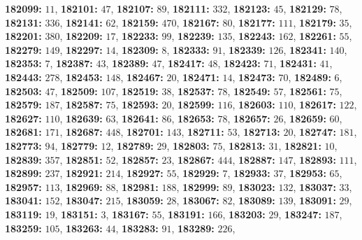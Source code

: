 \textsf{\bfseries 182099:} $11$, \textsf{\bfseries 182101:} $47$, \textsf{\bfseries 182107:} $89$, \textsf{\bfseries 182111:} $332$, \textsf{\bfseries 182123:} $45$, \textsf{\bfseries 182129:} $78$, \textsf{\bfseries 182131:} $336$, \textsf{\bfseries 182141:} $62$, \textsf{\bfseries 182159:} $470$, \textsf{\bfseries 182167:} $80$, \textsf{\bfseries 182177:} $111$, \textsf{\bfseries 182179:} $35$, \textsf{\bfseries 182201:} $380$, \textsf{\bfseries 182209:} $17$, \textsf{\bfseries 182233:} $99$, \textsf{\bfseries 182239:} $135$, \textsf{\bfseries 182243:} $162$, \textsf{\bfseries 182261:} $55$, \textsf{\bfseries 182279:} $149$, \textsf{\bfseries 182297:} $14$, \textsf{\bfseries 182309:} $8$, \textsf{\bfseries 182333:} $91$, \textsf{\bfseries 182339:} $126$, \textsf{\bfseries 182341:} $140$, \textsf{\bfseries 182353:} $7$, \textsf{\bfseries 182387:} $43$, \textsf{\bfseries 182389:} $47$, \textsf{\bfseries 182417:} $48$, \textsf{\bfseries 182423:} $71$, \textsf{\bfseries 182431:} $41$, \textsf{\bfseries 182443:} $278$, \textsf{\bfseries 182453:} $148$, \textsf{\bfseries 182467:} $20$, \textsf{\bfseries 182471:} $14$, \textsf{\bfseries 182473:} $70$, \textsf{\bfseries 182489:} $6$, \textsf{\bfseries 182503:} $47$, \textsf{\bfseries 182509:} $107$, \textsf{\bfseries 182519:} $38$, \textsf{\bfseries 182537:} $78$, \textsf{\bfseries 182549:} $57$, \textsf{\bfseries 182561:} $75$, \textsf{\bfseries 182579:} $187$, \textsf{\bfseries 182587:} $75$, \textsf{\bfseries 182593:} $20$, \textsf{\bfseries 182599:} $116$, \textsf{\bfseries 182603:} $110$, \textsf{\bfseries 182617:} $122$, \textsf{\bfseries 182627:} $110$, \textsf{\bfseries 182639:} $63$, \textsf{\bfseries 182641:} $86$, \textsf{\bfseries 182653:} $78$, \textsf{\bfseries 182657:} $26$, \textsf{\bfseries 182659:} $60$, \textsf{\bfseries 182681:} $171$, \textsf{\bfseries 182687:} $448$, \textsf{\bfseries 182701:} $143$, \textsf{\bfseries 182711:} $53$, \textsf{\bfseries 182713:} $20$, \textsf{\bfseries 182747:} $181$, \textsf{\bfseries 182773:} $94$, \textsf{\bfseries 182779:} $12$, \textsf{\bfseries 182789:} $29$, \textsf{\bfseries 182803:} $75$, \textsf{\bfseries 182813:} $31$, \textsf{\bfseries 182821:} $10$, \textsf{\bfseries 182839:} $357$, \textsf{\bfseries 182851:} $52$, \textsf{\bfseries 182857:} $23$, \textsf{\bfseries 182867:} $444$, \textsf{\bfseries 182887:} $147$, \textsf{\bfseries 182893:} $111$, \textsf{\bfseries 182899:} $237$, \textsf{\bfseries 182921:} $214$, \textsf{\bfseries 182927:} $55$, \textsf{\bfseries 182929:} $7$, \textsf{\bfseries 182933:} $37$, \textsf{\bfseries 182953:} $65$, \textsf{\bfseries 182957:} $113$, \textsf{\bfseries 182969:} $88$, \textsf{\bfseries 182981:} $188$, \textsf{\bfseries 182999:} $89$, \textsf{\bfseries 183023:} $132$, \textsf{\bfseries 183037:} $33$, \textsf{\bfseries 183041:} $152$, \textsf{\bfseries 183047:} $215$, \textsf{\bfseries 183059:} $28$, \textsf{\bfseries 183067:} $82$, \textsf{\bfseries 183089:} $139$, \textsf{\bfseries 183091:} $29$, \textsf{\bfseries 183119:} $19$, \textsf{\bfseries 183151:} $3$, \textsf{\bfseries 183167:} $55$, \textsf{\bfseries 183191:} $166$, \textsf{\bfseries 183203:} $29$, \textsf{\bfseries 183247:} $187$, \textsf{\bfseries 183259:} $105$, \textsf{\bfseries 183263:} $44$, \textsf{\bfseries 183283:} $91$, \textsf{\bfseries 183289:} $226$, 
